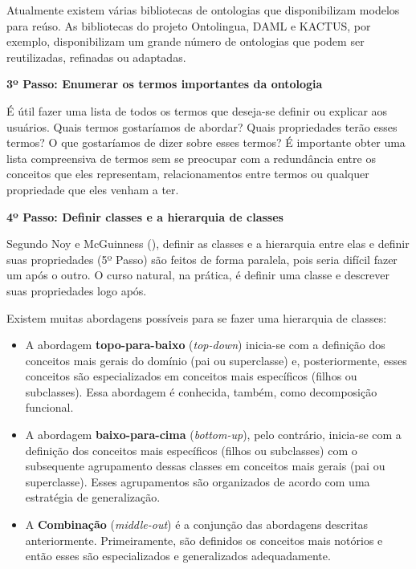   Atualmente existem várias bibliotecas de ontologias que disponibilizam modelos para reúso. As bibliotecas do projeto
  Ontolingua, DAML e KACTUS, por exemplo, disponibilizam um grande número de ontologias que podem ser reutilizadas, refinadas
  ou adaptadas. \cite{breitman05}
  
\vspace{0.5cm}  
  
{\raggedright  
  \textbf{3º Passo: Enumerar os termos importantes da ontologia}
}
  
  É útil fazer uma lista de todos os termos que deseja-se definir ou explicar aos usuários. Quais termos gostaríamos de abordar? 
  Quais propriedades terão esses termos? O que gostaríamos de dizer sobre esses termos? É importante obter uma lista compreensiva 
  de termos sem se preocupar com a redundância entre os conceitos que eles representam, relacionamentos entre termos ou qualquer 
  propriedade que eles venham a ter. \cite{noy15}
  
\vspace{0.5cm}  
  
{\raggedright  
  \textbf{4º Passo: Definir classes e a hierarquia de classes}
}
  
  Segundo Noy e McGuinness (\citeyear{noy15}), definir as classes e a hierarquia entre elas e definir  suas propriedades (5º Passo)
  são feitos de forma paralela,  pois seria difícil fazer um após o outro. O curso natural, na prática, é definir uma classe e 
  descrever suas propriedades logo após.
  
  Existem muitas abordagens possíveis para se fazer uma hierarquia de classes: \cite{breitman05}
  
  \begin{itemize}
   \item A abordagem \textbf{topo-para-baixo} (\textit{top-down}) inicia-se com a definição dos conceitos mais gerais do domínio (pai ou superclasse) 
   e, posteriormente, esses conceitos são especializados em conceitos mais específicos (filhos ou subclasses). Essa abordagem é 
   conhecida, também, como decomposição funcional. 
   \item A abordagem \textbf{baixo-para-cima} (\textit{bottom-up}), pelo contrário, inicia-se com a definição dos conceitos mais específicos 
   (filhos ou subclasses) com o subsequente agrupamento dessas classes em conceitos mais gerais (pai ou superclasse). Esses
   agrupamentos são organizados de acordo com uma estratégia de generalização. \cite{noy15}
   \item A \textbf{Combinação} (\textit{middle-out}) é a conjunção das abordagens descritas anteriormente. Primeiramente, são definidos
   os conceitos mais notórios e então esses são especializados e generalizados adequadamente. \cite{noy15}
  \end{itemize}
  
